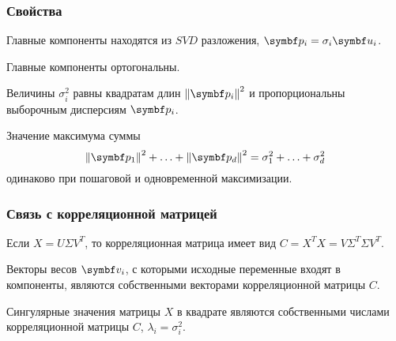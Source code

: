 \begin{frame}
  \frametitle{Свойства}

  Главные компоненты находятся из $SVD$ разложения, $\bp_i = \sigma_i \bu_i$. \pause

  Главные компоненты ортогональны. 

  Величины $\sigma^2_i$ равны квадратам длин $\norm{\bp_i}^2$ 
  и пропорциональны выборочным дисперсиям $\bp_i$.  \pause

Значение максимума суммы 
\[
  \norm{\bp_1}^2 + \ldots + \norm{\bp_d}^2 = \sigma^2_1 + \ldots + \sigma^2_d
\]
одинаково при пошаговой и одновременной максимизации.


\end{frame}


\begin{frame}
  \frametitle{Связь с корреляционной матрицей}
  Если $X = U\Sigma V^T$, то корреляционная матрица имеет вид $C=X^TX = V\Sigma^T \Sigma V^T$. \pause

  Векторы весов $\bv_i$, с которыми исходные переменные входят в компоненты, являются
  собственными векторами корреляционной матрицы $C$. \pause

  Сингулярные значения матрицы $X$ в квадрате являются собственными числами 
  корреляционной матрицы $C$, $\lambda_i = \sigma_i^2$.
  

\end{frame}
